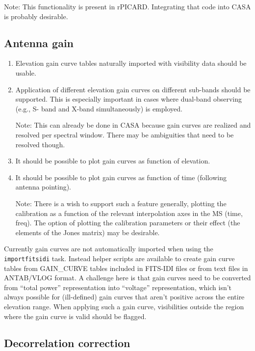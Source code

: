 \documentclass[11pt,a4paper]{article}
\begin{document}
Note: This functionality is present in rPICARD.  Integrating that code
into CASA is probably desirable.


\subsection{Antenna gain}

\begin{enumerate}[subseclist]

\item Elevation gain curve tables naturally imported with visibility
  data should be usable.

\item Application of different elevation gain curves on different
  sub-bands should be supported.  This is especially important in
  cases where dual-band observing (e.g., S- band and X-band
  simultaneously) is employed.

  Note: This can already be done in CASA because gain curves are
  realized and resolved per spectral window.  There may be ambiguities
  that need to be resolved though.

\item It should be possible to plot gain curves as function of elevation.

\item It should be possible to plot gain curves as function of time
  (following antenna pointing).

  Note: There is a wish to support such a feature generally, plotting
  the calibration as a function of the relevant interpolation axes in
  the MS (time, freq).  The option of plotting the calibration
  parameters or their effect (the elements of the Jones matrix) may be
  desirable.

\end{enumerate}

Currently gain curves are not automatically imported when using the
\texttt{importfitsidi} task.  Instead helper scripts are available to
create gain curve tables from GAIN{\_}CURVE tables included in
FITS-IDI files or from text files in ANTAB/VLOG format.  A challenge
here is that gain curves need to be converted from ``total power''
representation into ``voltage'' representation, which isn't always
possible for (ill-defined) gain curves that aren't positive across the
entire elevation range.  When applying such a gain curve, visibilities
outside the region where the gain curve is valid should be flagged.


\subsection{Decorrelation correction}
\end{document}
